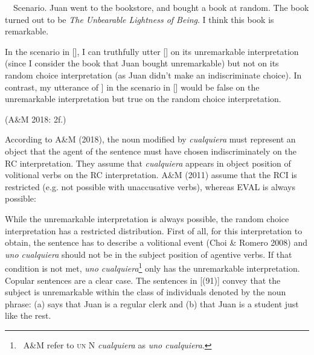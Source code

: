 \begin{styleStandard}
\label{bkm:Ref533953745}\ \ Scenario. Juan went to the bookstore, and bought a book at random. The book turned out to be \textit{The Unbearable Lightness of Being}. I think this book is remarkable.
\end{styleStandard}

\begin{styleStandard}
In the scenario in [], I can truthfully utter [] on its unremarkable interpretation (since I consider the book that Juan bought unremarkable) but not on its random choice interpretation (as Juan didn’t make an indiscriminate choice). In contrast, my utterance of ] in the scenario in [] would be false on the unremarkable interpretation but true on the random choice interpretation. 
\end{styleStandard}

\begin{styleStandard}
(A\&M 2018: 2f.)
\end{styleStandard}

\begin{styleStandard}
According to A\&M (2018), the noun modified by \textit{cualquiera} must represent an object that the agent of the sentence must have chosen indiscriminately on the RC interpretation. They assume that \textit{cualquiera} appears in object position of volitional verbs on the RC interpretation. A\&M (2011) assume that the RCI is restricted (e.g. not possible with unaccusative verbs), whereas EVAL is always possible:
\end{styleStandard}

\begin{styleStandard}
While the unremarkable interpretation is always possible, the random choice interpretation has a restricted distribution. First of all, for this interpretation to obtain, the sentence has to describe a volitional event (Choi \& Romero 2008) and \textit{uno cualquiera} should not be in the subject position of agentive verbs. If that condition is not met, \textit{uno cualquiera}\footnote{\textrm{\ A\&M refer to }\textsc{un}\textrm{\textit{ }}\textrm{N}\textrm{\textit{ cualquiera}}\textrm{ as }\textrm{\textit{uno cualquiera}}\textrm{.}} only has the unremarkable interpretation. Copular sentences are a clear case. The sentences in [(91)] convey that the subject is unremarkable within the class of individuals denoted by the noun phrase: (a) says that Juan is a regular clerk and (b) that Juan is a student just like the rest.
\end{styleStandard}

